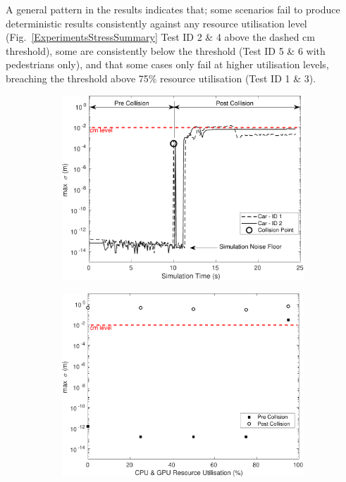 \documentclass[letterpaper, 10 pt, journal, twoside]{IEEEtran}
\begin{document}
A general pattern in the results indicates that; some scenarios fail to produce deterministic results consistently against any resource utilisation level (Fig.~\ref{ExperimentsStressSummary} Test ID 2 \& 4 above the dashed cm threshold), some are consistently below the threshold (Test ID 5 \& 6 with pedestrians only), and that some cases only fail at higher utilisation levels, breaching the threshold above 75\% resource utilisation (Test ID 1 \& 3).


\begin{figure}[h]
    \centering
    \begin{subfigure}{.49\textwidth}
        \includegraphics[width=1\textwidth]{Other/Figures/CarsCollisionCG25_V4.pdf}
        \caption{}
        \label{CarsCollisionCG25}
    \end{subfigure}
    \begin{subfigure}{.49\textwidth}
        \includegraphics[width=1\textwidth]{Other/Figures/CarsCollisionPrePostV3.pdf}

\end{subfigure}
\end{figure}
\end{document}
